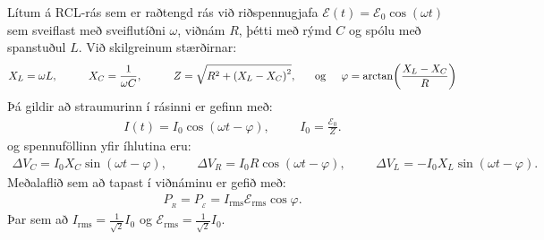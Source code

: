 \ifdefined \wholebook \else\documentclass[oneside]{book}\usepackage{EdlBook}\graphicspath{{figures/}}
\begin{document}
\begin{tcolorbox}
Lítum á RCL-rás sem er raðtengd rás við riðspennugjafa $\mathcal{E}(t) = \mathcal{E}_0 \cos(\omega t)$ sem sveiflast með sveiflutíðni $\omega$, viðnám $R$, þétti með rýmd $C$ og spólu með spanstuðul $L$. Við skilgreinum stærðirnar:
\begin{align*}
    X_L = \omega L, \hspace{1cm} X_C = \frac{1}{\omega C}, \hspace{1cm} Z = \sqrt{R^2 + \left(X_L - X_C \right)^2}, \hspace{0.6cm} \text{og} \hspace{0.5cm} \varphi = \arctan(\frac{X_L - X_C}{R})
\end{align*}
Þá gildir að straumurinn í rásinni er gefinn með:
\begin{align*}
    I(t) = I_0 \cos(\omega t - \varphi), \hspace{1cm} I_0 = \frac{\mathcal{E}_0}{Z}.
\end{align*}
og spennuföllinn yfir íhlutina eru:
\begin{align*}
    \Delta V_C = I_0 X_C \sin(\omega t - \varphi), \hspace{1cm} \Delta V_R = I_0 R \cos(\omega t - \varphi), \hspace{1cm} \Delta V_L = -I_0 X_L \sin(\omega t - \varphi).
\end{align*}
Meðalaflið sem að tapast í viðnáminu er gefið með:
\begin{align*}
     P_{\!_R} = P_{\!_{\mathcal{E}}} = I_{\text{rms}} \mathcal{E}_{\text{rms}} \cos\varphi.
\end{align*}
Þar sem að $I_{\text{rms}} = \frac{1}{\sqrt{2}}I_0$ og $\mathcal{E}_{\text{rms}} = \frac{1}{\sqrt{2}} I_{0}$.
\end{tcolorbox}
\end{document}
